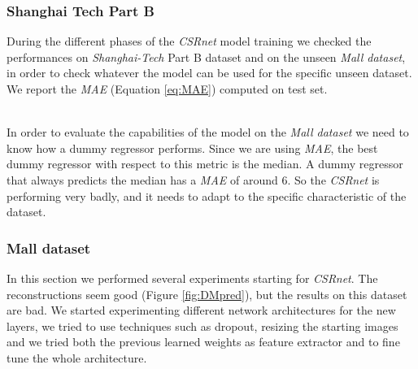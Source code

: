 \documentclass[10pt,twocolumn,letterpaper]{article}
\begin{document}
\subsubsection{Shanghai Tech Part B}
During the different phases of the \textit{CSRnet} model training we checked the performances on \textit{Shanghai-Tech} Part B dataset and on the unseen \textit{Mall dataset}, in order to check whatever the model can be used for the specific unseen dataset.
We report the \textit{MAE} (Equation \eqref{eq:MAE}) computed on test set.
\begin{table}[h!]
	\begin{center}
	\end{center}
	\caption{CSRnet results.}
	\label{CSRnetB}
\end{table}
\\
In order to evaluate the capabilities of the model on the \textit{Mall dataset} we need to know how a dummy regressor performs. Since we are using \textit{MAE}, the best dummy regressor with respect to this metric is the median. A dummy regressor that always predicts the median has a \textit{MAE} of around 6. So the \textit{CSRnet} is performing very badly, and it needs to adapt to the specific characteristic of the dataset.
	
\subsubsection{Mall dataset}
In this section we performed several experiments starting for \textit{CSRnet}. The reconstructions seem good (Figure \ref{fig:DMpred}), but the results on this dataset are bad. We started experimenting different network architectures for the new layers, we tried to use techniques such as dropout, resizing the starting images and we tried both the previous learned weights as feature extractor and to fine tune the whole architecture.
\end{document}
